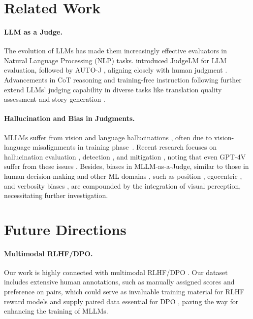 \section{Related Work}
\paragraph{LLM as a Judge.}
The evolution of LLMs has made them increasingly effective evaluators in Natural Language Processing (NLP) tasks. \citet{zhu2023judgelm} introduced JudgeLM for LLM evaluation, followed by AUTO-J \citep{li2023generative}, aligning closely with human judgment \citep{bai2023touchstone, li2023alpacaeval, kim2023prometheus}. Advancements in CoT reasoning \citep{wei2022chain, chu2023survey} and training-free instruction following \citep{brown2020language, wei2021finetuned} further extend LLMs' judging capability in diverse tasks like translation quality assessment \citep{kocmi2023large} and story generation \citep{chiang2023can}.

\paragraph{Hallucination and Bias in Judgments.}
MLLMs suffer from vision and language hallucinations \citep{ji2023survey, huang2023survey, cui2023holistic, wang2023evaluation}, often due to vision-language misalignments in training phase~\citep{sun2024trustllm, huang2023trustgpt}. Recent research focuses on hallucination evaluation \citep{liu2023hallusionbench}, detection \citep{li2023evaluating, wang2023evaluation}, and mitigation \citep{yin2023woodpecker, gunjal2023detecting, zhou2023analyzing}, noting that even GPT-4V suffer from these issues \citep{shi2023exploring, liu2023hallusionbench, cui2023holistic}. Besides, biases in MLLM-as-a-Judge, similar to those in human decision-making \citep{blunch1984position, raghubir2006center} and other ML domains \citep{wang2018position, liu2023lost}, such as position \citep{zheng2023large}, egocentric \citep{li2024leveraging}, and verbosity biases \citep{saito2023verbosity}, are compounded by the integration of visual perception, necessitating further investigation.

\section{Future Directions}
\paragraph{Multimodal RLHF/DPO.}
Our work is highly connected with multimodal RLHF/DPO \citep{sun2023aligning, li2023silkie, yu2023rlhf}. Our dataset includes extensive human annotations, such as manually assigned scores and preference on pairs, which could serve as invaluable training material for RLHF reward models and supply paired data essential for DPO \citep{rafailov2024direct, zhang2024direct}, paving the way for enhancing the training of MLLMs.

